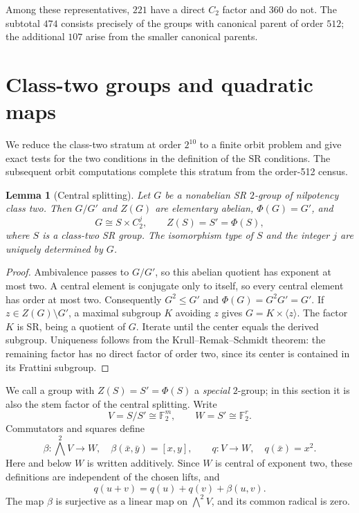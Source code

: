 \documentclass[11pt,a4paper]{amsart}
\newtheorem{lemma}[thm]{Lemma}
\theoremstyle{definition}
\theoremstyle{remark}
\numberwithin{equation}{section}
\begin{document}
Among these representatives, $221$ have a direct $C_2$ factor
and $360$ do not. The subtotal $474$ consists precisely
of the groups with canonical parent of order $512$; the
additional $107$ arise from the smaller canonical parents.


\section{Class-two groups and quadratic maps}\label{sec:class2}

We reduce the class-two stratum at order $2^{10}$ to a finite orbit
problem and give exact tests for the two conditions in the definition of
the SR conditions. The subsequent orbit computations complete this
stratum from the order-512 census.

\begin{lemma}[Central splitting]\label{lem:class2-split-new}
Let $G$ be a nonabelian SR $2$-group of nilpotency class two. Then
$G/G'$ and $Z(G)$ are elementary abelian, $\Phi(G)=G'$, and
\[
 G\cong S\times C_2^j,
 \qquad Z(S)=S'=\Phi(S),
\]
where $S$ is a class-two SR group. The isomorphism type of $S$ and the
integer $j$ are uniquely determined by $G$.
\end{lemma}
\begin{proof}
Ambivalence passes to $G/G'$, so this abelian quotient has exponent at
most two. A central element is conjugate only to itself, so every central
element has order at most two. Consequently $G^2\le G'$ and
$\Phi(G)=G^2G'=G'$. If $z\in Z(G)\setminus G'$, a maximal subgroup $K$
avoiding $z$ gives $G=K\times\langle z\rangle$. The factor $K$ is SR,
being a quotient of $G$. Iterate until the center equals the derived
subgroup. Uniqueness follows from the Krull--Remak--Schmidt theorem:
the remaining factor has no direct factor of order two, since its center
is contained in its Frattini subgroup.
\end{proof}

We call a group with $Z(S)=S'=\Phi(S)$ a \emph{special} $2$-group; in
this section it is also the stem factor of the central splitting.
Write
\[
 V=S/S'\cong\mathbb F_2^m,\qquad W=S'\cong\mathbb F_2^r.
\]
Commutators and squares define
\[
 \beta:\bigwedge^2V\longrightarrow W,
 \quad \beta(\bar x,\bar y)=[x,y],
 \qquad q:V\longrightarrow W,\quad q(\bar x)=x^2.
\]
Here and below $W$ is written additively. Since $W$ is central of
exponent two, these definitions are independent of the chosen lifts,
and
\begin{equation}\label{eq:polar-new}
 q(u+v)=q(u)+q(v)+\beta(u,v).
\end{equation}
The map $\beta$ is surjective as a linear map on $\bigwedge^2V$, and its
common radical is zero.
\end{document}
